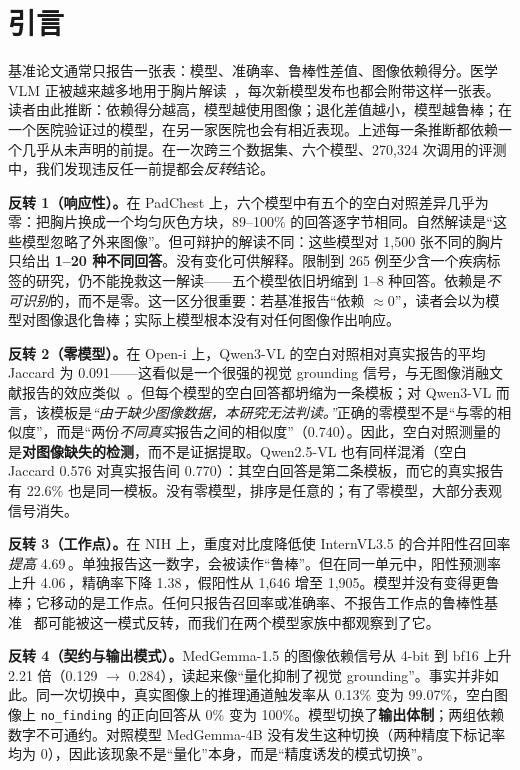 \section{引言}
\label{sec:intro}

基准论文通常只报告一张表：模型、准确率、鲁棒性差值、图像依赖得分。医学 VLM 正被越来越多地用于胸片解读~\citep{chen2024chexagent,sellergren2025medgemma,bai2025qwen25vl}，每次新模型发布也都会附带这样一张表。读者由此推断：依赖得分越高，模型越使用图像；退化差值越小，模型越鲁棒；在一个医院验证过的模型，在另一家医院也会有相近表现。上述每一条推断都依赖一个几乎从未声明的前提。在一次跨三个数据集、六个模型、270,324 次调用的评测中，我们发现违反任一前提都会\emph{反转}结论。

\textbf{反转 1（响应性）。}在 PadChest 上，六个模型中有五个的空白对照差异几乎为零：把胸片换成一个均匀灰色方块，89--100\% 的回答逐字节相同。自然解读是``这些模型忽略了外来图像''。但可辩护的解读不同：这些模型对 1,500 张不同的胸片只给出 \textbf{1--20 种不同回答}。没有变化可供解释。限制到 265 例至少含一个疾病标签的研究，仍不能挽救这一解读——五个模型依旧坍缩到 1--8 种回答。依赖是\emph{不可识别}的，而不是零。这一区分很重要：若基准报告``依赖 $\approx 0$''，读者会以为模型对图像退化鲁棒；实际上模型根本没有对任何图像作出响应。

\textbf{反转 2（零模型）。}在 Open-i 上，Qwen3-VL 的空白对照相对真实报告的平均 Jaccard 为 0.091——这看似是一个很强的视觉 grounding 信号，与无图像消融文献报告的效应类似~\citep{anon2026see,anon2026guess}。但每个模型的空白回答都坍缩为一条模板；对 Qwen3-VL 而言，该模板是\emph{``由于缺少图像数据，本研究无法判读。''}正确的零模型不是``与零的相似度''，而是``两份\emph{不同真实}报告之间的相似度''（0.740）。因此，空白对照测量的是\textbf{对图像缺失的检测}，而不是证据提取。Qwen2.5-VL 也有同样混淆（空白 Jaccard 0.576 对真实报告间 0.770）：其空白回答是第二条模板，而它的真实报告有 22.6\% 也是同一模板。没有零模型，排序是任意的；有了零模型，大部分表观信号消失。

\textbf{反转 3（工作点）。}在 NIH 上，重度对比度降低使 InternVL3.5 的合并阳性召回率\emph{提高} 4.69\,\pp{}。单独报告这一数字，会被读作``鲁棒''。但在同一单元中，阳性预测率上升 4.06\,\pp{}，精确率下降 1.38\,\pp{}，假阳性从 1,646 增至 1,905。模型并没有变得更鲁棒；它移动的是工作点。任何只报告召回率或准确率、不报告工作点的鲁棒性基准~\citep{anon2025corruption,anon2026stress} 都可能被这一模式反转，而我们在两个模型家族中都观察到了它。

\textbf{反转 4（契约与输出模式）。}MedGemma-1.5 的图像依赖信号从 4-bit 到 bf16 上升 2.21 倍（0.129 $\rightarrow$ 0.284），读起来像``量化抑制了视觉 grounding''。事实并非如此。同一次切换中，真实图像上的推理通道触发率从 0.13\% 变为 99.07\%，空白图像上 \texttt{no\_finding} 的正向回答从 0\% 变为 100\%。模型切换了\textbf{输出体制}；两组依赖数字不可通约。对照模型 MedGemma-4B 没有发生这种切换（两种精度下标记率均为 0），因此该现象不是``量化''本身，而是``精度诱发的模式切换''。

